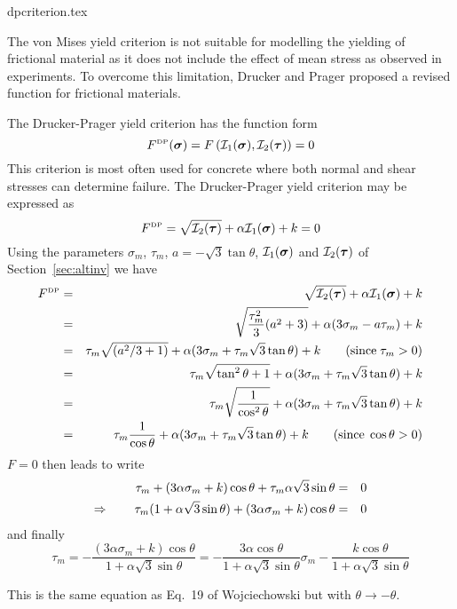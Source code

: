 \begin{flushright} {\tiny {\color{gray} dpcriterion.tex}} \end{flushright}

The von Mises yield criterion is not suitable for modelling the yielding of frictional material 
as it does not include the effect of mean stress as observed in experiments. To overcome this 
limitation, Drucker and Prager \cite{drpr52} proposed a revised function for frictional materials.

The Drucker-Prager yield criterion has the function form
\begin{equation}
F^{\text{\tiny DP}}({\bm \sigma})=F \left( {\cal I}_1({\bm \sigma}), {\cal I}_2({\bm \tau}) \right) = 0 
\end{equation}
This criterion is most often used for concrete where both normal and shear stresses 
can determine failure. The Drucker-Prager yield criterion may be expressed as
\begin{equation}
F^{\text{\tiny DP}}= \sqrt{{\cal I}_2({\bm \tau})} + \alpha {\cal I}_1({\bm \sigma}) + k =0  \label{dpcriterion} 
\end{equation}
Using the parameters $\sigma_m$, $\tau_m$, $a=-\sqrt{3}\tan\theta$, ${\cal I}_1({\bm \sigma})$ 
and ${\cal I}_2({\bm \tau})$ of Section~\ref{sec:altinv} we have
\begin{eqnarray}
F^{\text{\tiny DP}}
&=&  \sqrt{{\cal I}_2({\bm \tau})} + \alpha {\cal I}_1({\bm \sigma}) + k \nonumber\\
&=& \sqrt{\frac{\tau_m^2}{3}(a^2+3)} + \alpha (3\sigma_m-a\tau_m) + k \nonumber\\ 
&=& \tau_m \sqrt{(a^2/3+1)} + \alpha (3\sigma_m+\tau_m\sqrt{3}\tan\theta ) + k    \qquad ({\rm since }\; \tau_m>0)\nonumber\\ 
&=& \tau_m \sqrt{\tan^2\theta+1} + \alpha (3\sigma_m+\tau_m\sqrt{3}\tan\theta ) + k  \nonumber\\
&=& \tau_m \sqrt{ \frac{1}{\cos^2\theta} } + \alpha (3\sigma_m+\tau_m\sqrt{3}\tan\theta ) + k  \nonumber\\
&=& \tau_m \frac{1}{\cos\theta} +\alpha (3\sigma_m+\tau_m\sqrt{3}\tan\theta ) + k  \qquad ({\rm since }\; \cos\theta >0)\nonumber
\end{eqnarray}
$F=0$ then leads to write
\begin{eqnarray}
\tau_m  + (3 \alpha \sigma_m+k)\cos\theta  + \tau_m \alpha \sqrt{3}\sin\theta  &=&0 \nonumber\\
\Rightarrow \qquad \tau_m(1 + \alpha \sqrt{3}\sin\theta)  + (3 \alpha \sigma_m+k)\cos\theta &=&0 \nonumber
\end{eqnarray}
and finally
\[
\tau_m = -\frac{(3 \alpha \sigma_m+k)\cos\theta}{1 + \alpha \sqrt{3}\sin\theta}
= -\frac{3 \alpha \cos\theta}{1 + \alpha \sqrt{3}\sin\theta} \sigma_m 
-\frac{k\cos\theta}{1 + \alpha \sqrt{3}\sin\theta}
\]
\begin{remark}
This is the same equation as Eq.~19 of Wojciechowski \cite{wojc18} but with $\theta \rightarrow -\theta$. 
\end{remark}

